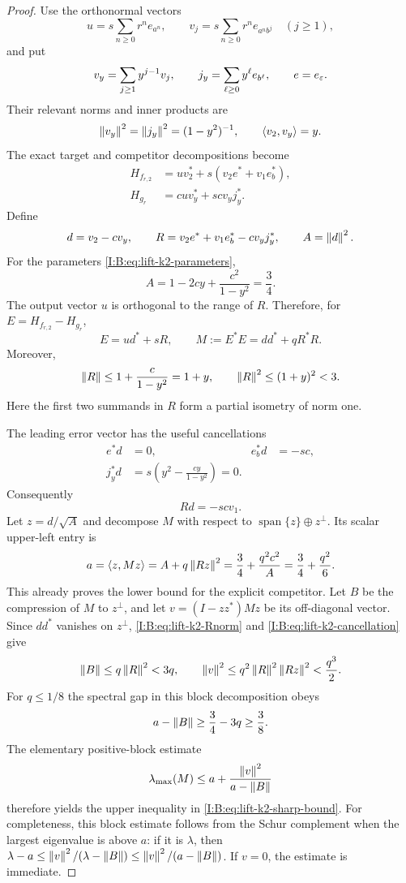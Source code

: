 \begin{proof}
Use the orthonormal vectors
\[
 u=s\sum_{n\ge0}r^n e_{a^n},\qquad
 v_j=s\sum_{n\ge0}r^n e_{a^n b^j}\quad(j\ge1),
\]
and put
\[
 v_y=\sum_{j\ge1}y^{j-1}v_j,\qquad
 j_y=\sum_{\ell\ge0}y^\ell e_{b^\ell},\qquad e=e_\varepsilon.
\]
Their relevant norms and inner products are
\[
 \left\lVert v_y\right\rVert^2=\left\lVert j_y\right\rVert^2=(1-y^2)^{-1},\qquad
 \langle v_2,v_y\rangle=y.
\]
The exact target and competitor decompositions become
\begin{align*}
 H_{f_{r,2}}&=uv_2^*+s(v_2e^*+v_1e_b^*),\\
 H_{g_r}&=cu v_y^*+scv_yj_y^*.
\end{align*}
Define
\[
 d=v_2-cv_y,\qquad
 R=v_2e^*+v_1e_b^*-cv_yj_y^*,\qquad A=\left\lVert d\right\rVert^2.
\]
For the parameters \eqref{I:B:eq:lift-k2-parameters},
\[
 A=1-2cy+\frac{c^2}{1-y^2}=\frac34.
\]
The output vector $u$ is orthogonal to the range of $R$. Therefore, for
$E=H_{f_{r,2}}-H_{g_r}$,
\begin{equation}
 E=ud^*+sR,\qquad M:=E^*E=dd^*+qR^*R.
 \label{I:B:eq:lift-k2-orthogonal-error}
\end{equation}
Moreover,
\begin{equation}
 \left\lVert R\right\rVert\le1+\frac{c}{1-y^2}=1+y,
 \qquad \left\lVert R\right\rVert^2\le(1+y)^2<3.
 \label{I:B:eq:lift-k2-Rnorm}
\end{equation}
Here the first two summands in $R$ form a partial isometry of norm one.

The leading error vector has the useful cancellations
\begin{align*}
 e^*d&=0,& e_b^*d&=-sc,\\
 j_y^*d&=s\left(y^2-\frac{cy}{1-y^2}\right)=0.
\end{align*}
Consequently
\begin{equation}
 Rd=-scv_1.
 \label{I:B:eq:lift-k2-cancellation}
\end{equation}
Let $z=d/\sqrt A$ and decompose $M$ with respect to
$\operatorname{span}\{z\}\oplus z^\perp$. Its scalar upper-left entry
is
\begin{equation}
 a=\langle z,Mz\rangle
   =A+q\left\lVert Rz\right\rVert^2
   =\frac34+\frac{q^2c^2}{A}
   =\frac34+\frac{q^2}{6}.
 \label{I:B:eq:lift-k2-Rayleigh}
\end{equation}
This already proves the lower bound for the explicit competitor.
Let $B$ be the compression of $M$ to $z^\perp$, and let
$v=(I-zz^*)Mz$ be its off-diagonal vector. Since $dd^*$ vanishes on
$z^\perp$, \eqref{I:B:eq:lift-k2-Rnorm} and
\eqref{I:B:eq:lift-k2-cancellation} give
\[
 \left\lVert B\right\rVert\le q\left\lVert R\right\rVert^2<3q,
 \qquad
 \left\lVert v\right\rVert^2\le q^2\left\lVert R\right\rVert^2\left\lVert Rz\right\rVert^2
             <\frac{q^3}{2}.
\]
For $q\le1/8$ the spectral gap in this block decomposition obeys
\[
 a-\left\lVert B\right\rVert\ge\frac34-3q\ge\frac38.
\]
The elementary positive-block estimate
\[
 \lambda_{\max}(M)
 \le a+\frac{\left\lVert v\right\rVert^2}{a-\left\lVert B\right\rVert}
\]
therefore yields the upper inequality in
\eqref{I:B:eq:lift-k2-sharp-bound}. For completeness, this block estimate
follows from the Schur complement when the largest eigenvalue is above
$a$: if it is $\lambda$, then
$\lambda-a\le\left\lVert v\right\rVert^2/(\lambda-\left\lVert B\right\rVert)
\le\left\lVert v\right\rVert^2/(a-\left\lVert B\right\rVert)$. If $v=0$, the estimate is immediate.
\end{proof}
